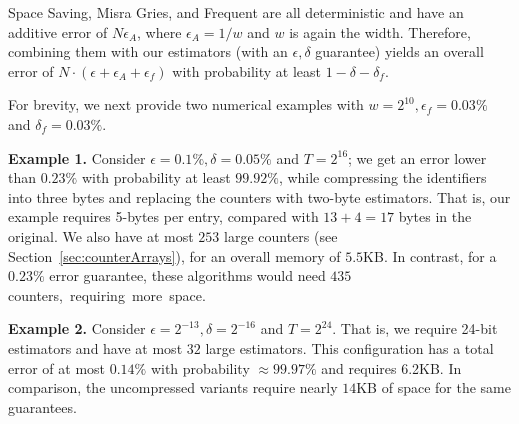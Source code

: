 Space Saving, Misra Gries, and Frequent are all deterministic and have an additive error of $N\epsilon_A$, where $\epsilon_A=1/w$ and $w$ is again the width. Therefore, combining them with our estimators (with an $\epsilon,\delta$ guarantee) yields an overall error of $N\cdot(\epsilon+\epsilon_A+\epsilon_f)$ 
with probability at least $1-\delta-\delta_f$.

For brevity, we next provide two numerical examples with $w{=}2^{10}, \epsilon_f{=}0.03\%$ and $\delta_f{=}0.03\%$.

\noindent\textbf{Example 1.} Consider $\epsilon{=}0.1\%, \delta{=}0.05\%$ and $T=2^{16}$; we get an error lower than $0.23\%$ with probability at least $99.92\%$, while compressing the identifiers into three bytes and replacing the counters with two-byte estimators. 
That is, our example requires 5-bytes per entry, compared with $13+4=17$  bytes in the original.
We also have at most $253$ large counters (see Section~\ref{sec:counterArrays}), for an overall memory of $5.5$KB. In contrast, for a $0.23\%$ error guarantee, these algorithms would need $435$ \mbox{counters, requiring more space.}


\noindent\textbf{Example 2.} Consider $\epsilon=2^{-13},\delta=2^{-16}$ and $T=2^{24}$. That is, we require 24-bit estimators and have at most $32$ large estimators. This configuration has a total error of at most $0.14\%$ with probability $\approx 99.97\%$ and requires 6.2KB. In comparison, the uncompressed variants require nearly $14$KB of space for the same guarantees. 

